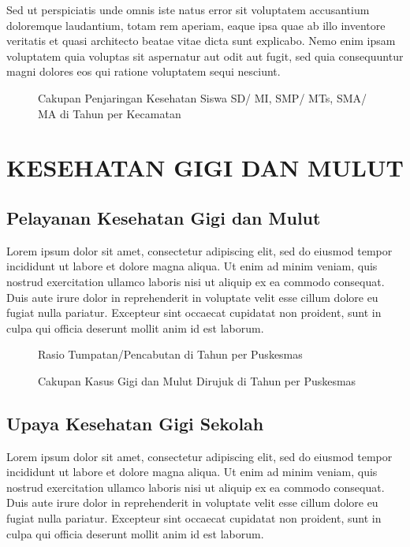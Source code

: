 Sed ut perspiciatis unde omnis iste natus error sit voluptatem accusantium doloremque laudantium, totam rem aperiam, eaque ipsa quae ab illo inventore veritatis et quasi architecto beatae vitae dicta sunt explicabo. Nemo enim ipsam voluptatem quia voluptas sit aspernatur aut odit aut fugit, sed quia consequuntur magni dolores eos qui ratione voluptatem sequi nesciunt.

\begin{figure}[H]
    \centering
    \caption{Cakupan Penjaringan Kesehatan Siswa SD/ MI, SMP/ MTs, SMA/ MA di \namaKabupaten Tahun \tP per Kecamatan}
    \label{fig:Cakupan-Penjaringan-Siswa}
\end{figure}

\section{KESEHATAN GIGI DAN MULUT}
\subsection{Pelayanan Kesehatan Gigi dan Mulut}
Lorem ipsum dolor sit amet, consectetur adipiscing elit, sed do eiusmod tempor incididunt ut labore et dolore magna aliqua. Ut enim ad minim veniam, quis nostrud exercitation ullamco laboris nisi ut aliquip ex ea commodo consequat. Duis aute irure dolor in reprehenderit in voluptate velit esse cillum dolore eu fugiat nulla pariatur. Excepteur sint occaecat cupidatat non proident, sunt in culpa qui officia deserunt mollit anim id est laborum.

\begin{figure}[H]
	\centering
	\caption{Rasio Tumpatan/Pencabutan di \namaKabupaten Tahun \tP per Puskesmas}
	\label{fig:Cakupan-Pelayanan-Kesehatan-Gigi-Mulut-Tumpatan}
\end{figure}

\begin{figure}[H]
	\centering
	\caption{Cakupan Kasus Gigi dan Mulut Dirujuk di \namaKabupaten Tahun \tP per Puskesmas}
	\label{fig:Cakupan-Pelayanan-Kesehatan-Gigi-Mulut-Dirujuk}
\end{figure}

\subsection{Upaya Kesehatan Gigi Sekolah}
Lorem ipsum dolor sit amet, consectetur adipiscing elit, sed do eiusmod tempor incididunt ut labore et dolore magna aliqua. Ut enim ad minim veniam, quis nostrud exercitation ullamco laboris nisi ut aliquip ex ea commodo consequat. Duis aute irure dolor in reprehenderit in voluptate velit esse cillum dolore eu fugiat nulla pariatur. Excepteur sint occaecat cupidatat non proident, sunt in culpa qui officia deserunt mollit anim id est laborum.

